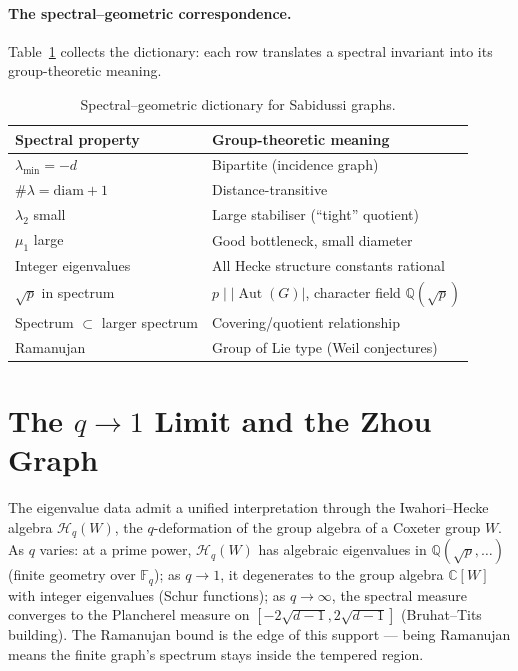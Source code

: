 \documentclass[mlmain]{jmlr}
\newcommand{\Aut}{\operatorname{Aut}}
\newcommand{\HH}{\mathcal{H}}
\newcommand{\F}{\mathbb{F}}
\newcommand{\CC}{\mathbb{C}}
\newcommand{\Q}{\mathbb{Q}}
\begin{document}
\paragraph{The spectral--geometric correspondence.}
Table~\ref{tab:dictionary} collects the dictionary:
each row translates a spectral invariant into its
group-theoretic meaning.

\begin{table}[t]
\caption{Spectral--geometric dictionary for Sabidussi graphs.}
\label{tab:dictionary}
\centering
\small
\begin{tabular}{@{}ll@{}}
\toprule
Spectral property & Group-theoretic meaning \\
\midrule
$\lambda_{\min} = -d$ & Bipartite (incidence graph) \\
$\#\lambda = \mathrm{diam} + 1$ & Distance-transitive \\
$\lambda_2$ small & Large stabiliser (``tight'' quotient) \\
$\mu_1$ large & Good bottleneck, small diameter \\
Integer eigenvalues & All Hecke structure constants rational \\
$\sqrt{p}$ in spectrum & $p \mid |\Aut(G)|$, character field $\Q(\sqrt{p})$ \\
Spectrum $\subset$ larger spectrum & Covering/quotient relationship \\
Ramanujan & Group of Lie type (Weil conjectures) \\
\bottomrule
\end{tabular}
\end{table}


\section{The $q \to 1$ Limit and the Zhou Graph}
\label{sec:qlimit}

The eigenvalue data admit a unified interpretation through
the Iwahori--Hecke algebra $\HH_q(W)$, the $q$-deformation
of the group algebra of a Coxeter group $W$.  As $q$ varies:
at a prime power, $\HH_q(W)$ has algebraic eigenvalues in
$\Q(\sqrt{p}, \ldots)$ (finite geometry over $\F_q$);
as $q \to 1$, it degenerates to the group algebra $\CC[W]$
with integer eigenvalues (Schur functions);
as $q \to \infty$, the spectral measure converges to the
Plancherel measure on $[-2\sqrt{d-1}, 2\sqrt{d-1}]$
(Bruhat--Tits building).
The Ramanujan bound is the edge of this support ---
being Ramanujan means the finite graph's spectrum stays
inside the tempered region.
\end{document}
